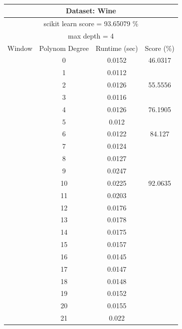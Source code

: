 \documentclass{article}
\begin{document}
\newpage
\begin{multicols}{2}
\begin{table}[H]
\caption{}
\label{tab:my-table}
\begin{tabular}{|c|c|c|c|}
\hline
\multicolumn{4}{|c|}{\textbf{Dataset: Wine}} \\ \hline
\multicolumn{4}{|c|}{scikit learn score = 93.65079 \%} \\ \hline
\multicolumn{4}{|c|}{max depth = 4} \\ \hline
Window & Polynom Degree & Runtime (sec) & Score (\%) \\ \hline
 & 0 & 0.0152 & 46.0317 \\ \cline{2-4} 
 & 1 & 0.0112 &  \\ \cline{2-3}
 & 2 & 0.0126 & \multirow{-2}{*}{55.5556} \\ \cline{2-4} 
 & 3 & 0.0116 &  \\ \cline{2-3}
 & 4 & 0.0126 & \multirow{-2}{*}{76.1905} \\ \cline{2-4} 
 & 5 & 0.012 &  \\ \cline{2-3}
 & 6 & 0.0122 & \multirow{-2}{*}{84.127} \\ \cline{2-4} 
 & 7 & 0.0124 &  \\ \cline{2-3}
 & 8 & 0.0127 &  \\ \cline{2-3}
 & 9 & 0.0247 &  \\ \cline{2-3}
 & 10 & 0.0225 & \multirow{-4}{*}{92.0635} \\ \cline{2-4} 
 & \cellcolor[HTML]{FFFFC7}11 & \cellcolor[HTML]{FFFFC7}0.0203 & \cellcolor[HTML]{FFFFC7} \\ \cline{2-3}
 & 12 & 0.0176 & \cellcolor[HTML]{FFFFC7} \\ \cline{2-3}
 & 13 & 0.0178 & \cellcolor[HTML]{FFFFC7} \\ \cline{2-3}
 & 14 & 0.0175 & \cellcolor[HTML]{FFFFC7} \\ \cline{2-3}
 & 15 & 0.0157 & \cellcolor[HTML]{FFFFC7} \\ \cline{2-3}
 & 16 & 0.0145 & \cellcolor[HTML]{FFFFC7} \\ \cline{2-3}
 & 17 & 0.0147 & \cellcolor[HTML]{FFFFC7} \\ \cline{2-3}
 & 18 & 0.0148 & \cellcolor[HTML]{FFFFC7} \\ \cline{2-3}
 & 19 & 0.0152 & \cellcolor[HTML]{FFFFC7} \\ \cline{2-3}
 & 20 & 0.0155 & \cellcolor[HTML]{FFFFC7} \\ \cline{2-3}
 & 21 & 0.022 & \cellcolor[HTML]{FFFFC7} \\ \cline{2-3}

\end{tabular}
\end{table}
\end{multicols}
\end{document}
